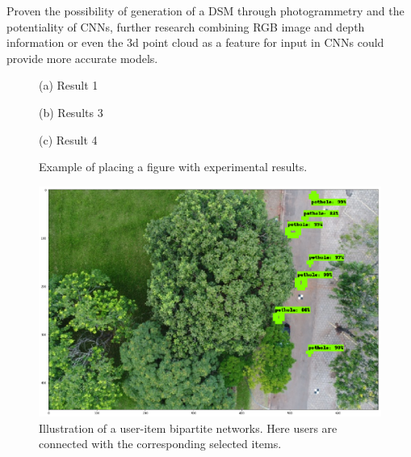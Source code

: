 \documentclass{article}
\begin{document}
Proven the possibility of generation of a DSM through photogrammetry and the potentiality of CNNs, further research combining RGB image and depth information or even the 3d point cloud as a feature for input in CNNs could provide more accurate models.


\begin{figure}[htb]
\begin{minipage}[b]{1.0\linewidth}
  \centering
  \centerline{}
  \centerline{(a) Result 1}\medskip
\end{minipage}
%
\begin{minipage}[b]{.48\linewidth}
  \centering
  \vspace{1.5cm}
  \centerline{(b) Results 3}\medskip
\end{minipage}
\hfill
\begin{minipage}[b]{0.48\linewidth}
  \centering
  \vspace{1.5cm}
  \centerline{(c) Result 4}\medskip
\end{minipage}
%
\caption{Example of placing a figure with experimental results.}
\label{fig:res}
%
\end{figure}

\begin{figure}[!ht]
   \centering
   \begin{center}
     \includegraphics*[width=0.8\linewidth]{obj_det}
   \caption{Illustration of a user-item bipartite networks. Here users are connected with the corresponding selected items.}
   \label{fig:user-item-bipartite}
   \end{center}
\end{figure}
\vfill
\pagebreak
\end{document}
